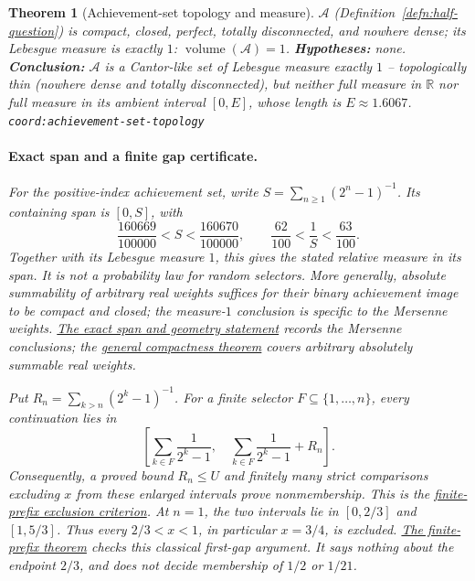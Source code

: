 \documentclass[11pt]{article}
\theoremstyle{plain}
\newtheorem{thm}{Theorem}[section]
\theoremstyle{definition}
\theoremstyle{remark}
\newcommand{\coord}[1]{\texorpdfstring{{\small\nolinkurl{coord:#1}}}{coord:#1}\xspace}
\begin{document}
\begin{thm}[Achievement-set topology and measure]
\label{thm:topology}
$\mathcal{A}$ (Definition~\ref{defn:half-question}) is compact, closed, perfect, totally
disconnected, and nowhere dense; its Lebesgue measure is exactly $1$:
$\operatorname{volume}(\mathcal{A}) = 1$. \textbf{Hypotheses:} none. \textbf{Conclusion:}
$\mathcal{A}$ is a Cantor-like set of Lebesgue measure exactly $1$ -- topologically thin
(nowhere dense and totally disconnected), but neither full measure in $\mathbb R$ nor full
measure in its ambient interval $[0,E]$, whose length is $E\approx1.6067$.
\coord{achievement-set-topology}

\paragraph{Exact span and a finite gap certificate.}
For the positive-index achievement set, write
$S=\sum_{n\ge1}(2^n-1)^{-1}$.  Its containing span is $[0,S]$, with
\[
 \frac{160669}{100000}<S<\frac{160670}{100000},\qquad
 \frac{62}{100}<\frac1S<\frac{63}{100}.
\]
Together with its Lebesgue measure $1$, this gives the stated relative
measure in its span.  It is not a probability law for random selectors.
More generally, absolute summability of arbitrary real weights suffices
for their binary achievement image to be compact and closed; the measure-$1$
conclusion is specific to the Mersenne weights.
\href{https://github.com/wcook04/plectis-erdos/blob/d4fed71423840f70f10edf27b9ad27c22fc4f49a/ErdosProblems/Erdos257/PaperCompleteR8/GeometryUpgrade.lean#L94}{The exact span and geometry statement}
records the Mersenne conclusions; the \href{https://github.com/wcook04/plectis-erdos/blob/d4fed71423840f70f10edf27b9ad27c22fc4f49a/ErdosProblems/Erdos257/PaperCompleteR8/GeometryUpgrade.lean#L118}{general compactness theorem}
covers arbitrary absolutely summable real weights.

Put $R_n=\sum_{k>n}(2^k-1)^{-1}$.  For a finite selector
$F\subseteq\{1,\ldots,n\}$, every continuation lies in
\[
 \left[\sum_{k\in F}\frac1{2^k-1},\quad
       \sum_{k\in F}\frac1{2^k-1}+R_n\right].
\]
Consequently, a proved bound $R_n\le U$ and finitely many strict comparisons
excluding $x$ from these enlarged intervals prove nonmembership.
This is the \href{https://github.com/wcook04/plectis-erdos/blob/d4fed71423840f70f10edf27b9ad27c22fc4f49a/ErdosProblems/Erdos257/PaperCompleteR8/FinitePrefixExclusion.lean#L32}{finite-prefix exclusion criterion}.
At $n=1$, the two intervals lie in $[0,2/3]$ and $[1,5/3]$.
Thus every $2/3<x<1$, in particular $x=3/4$, is excluded.
\href{https://github.com/wcook04/plectis-erdos/blob/d4fed71423840f70f10edf27b9ad27c22fc4f49a/ErdosProblems/Erdos257/PaperCompleteR8/FinitePrefixExclusion.lean#L46}{The finite-prefix theorem}
checks this classical first-gap argument.  It says nothing about the
endpoint $2/3$, and does not decide membership of $1/2$ or $1/21$.



\end{thm}
\end{document}
